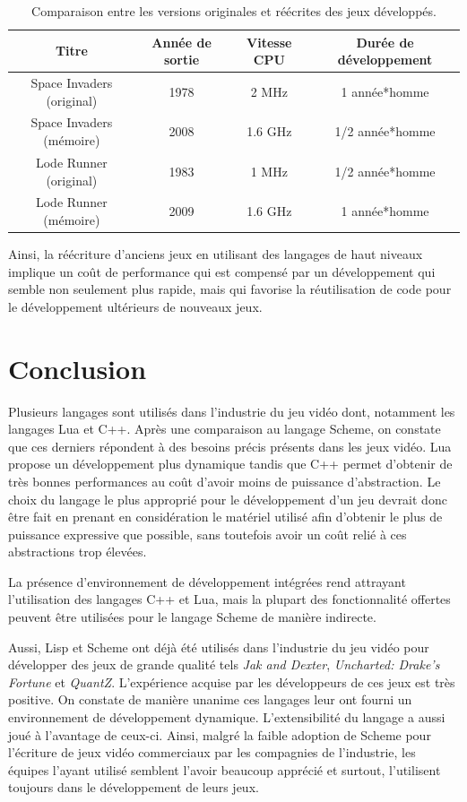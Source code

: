 \documentclass[12pt,twoside,letterpaper,francais]{book}
\newcommand{\customizedTableName}{\textsc{Tableau}}
\begin{document}
\renewcommand{\tablename}{\customizedTableName}
\begin{table}[htb!]
  \begin{tabular}{cccc}
    Titre & Année de sortie & Vitesse CPU & Durée de développement\\
    \hline \hline 
    Space Invaders (original) & 1978 & 2 MHz & 1 année*homme\\
    Space Invaders (mémoire) & 2008 & 1.6 GHz & 1/2 année*homme\\
    \hline
    Lode Runner (original) & 1983 & 1 MHz & 1/2 année*homme\\
    Lode Runner (mémoire) & 2009 & 1.6 GHz & 1 année*homme\\
    \hline
  \end{tabular}
  \caption{Comparaison entre les versions originales et réécrites des
    jeux développés.}
  \label{Rev:comp}
\end{table}

Ainsi, la réécriture d'anciens jeux en utilisant des langages de haut
niveaux implique un coût de performance qui est compensé par un
développement qui semble non seulement plus rapide, mais qui favorise
la réutilisation de code pour le développement ultérieurs de nouveaux
jeux.

\FloatBarrier
\section{Conclusion}
Plusieurs langages sont utilisés dans l'industrie du jeu vidéo dont,
notamment les langages Lua et C++. Après une comparaison au langage
Scheme, on constate que ces derniers répondent à des besoins précis
présents dans les jeux vidéo. Lua propose un dévelop\-pement plus
dynamique tandis que C++ permet d'obtenir de très bonnes performances
au coût d'avoir moins de puissance d'abstraction. Le choix du langage
le plus approprié pour le dévelop\-pement d'un jeu devrait donc être
fait en prenant en considération le matériel utilisé afin d'obtenir le
plus de puissance expressive que possible, sans toutefois avoir un
coût relié à ces abstractions trop élevées.

La présence d'environnement de développement intégrées rend attrayant
l'utilisation des langages C++ et Lua, mais la plupart des
fonctionnalité offertes peuvent être utilisées pour le langage Scheme
de manière indirecte.

Aussi, Lisp et Scheme ont déjà été utilisés dans l'industrie du jeu
vidéo pour développer des jeux de grande qualité tels \textit{Jak and
  Dexter}, \textit{Uncharted: Drake's Fortune} et
\textit{QuantZ}. L'expérience acquise par les développeurs de ces jeux
est très positive. On constate de manière unanime ces langages leur
ont fourni un environnement de dévelop\-pement
dynamique. L'extensibilité du langage a aussi joué à l'avantage de
ceux-ci. Ainsi, malgré la faible adoption de Scheme pour l'écriture de
jeux vidéo commerciaux par les compagnies de l'industrie, les équipes
l'ayant utilisé semblent l'avoir beaucoup apprécié et surtout,
l'utilisent toujours dans le dévelop\-pement de leurs jeux.
\end{document}
